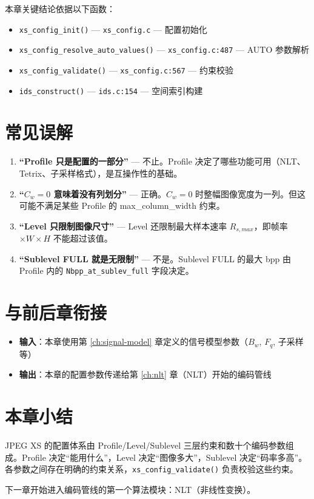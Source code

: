\begin{codefact}
本章关键结论依据以下函数：
\begin{itemize}
  \item \texttt{xs\_config\_init()} --- \texttt{xs\_config.c} --- 配置初始化
  \item \texttt{xs\_config\_resolve\_auto\_values()} --- \texttt{xs\_config.c:487} --- AUTO 参数解析
  \item \texttt{xs\_config\_validate()} --- \texttt{xs\_config.c:567} --- 约束校验
  \item \texttt{ids\_construct()} --- \texttt{ids.c:154} --- 空间索引构建
\end{itemize}
\end{codefact}

\section{常见误解}

\begin{misunderstanding}
\begin{enumerate}
  \item \textbf{``Profile 只是配置的一部分''} --- 不止。Profile 决定了哪些功能可用（NLT、Tetrix、子采样格式），是互操作性的基础。
  \item \textbf{``$C_w = 0$ 意味着没有列划分''} --- 正确。$C_w = 0$ 时整幅图像宽度为一列。但这可能不满足某些 Profile 的 max\_column\_width 约束。
  \item \textbf{``Level 只限制图像尺寸''} --- Level 还限制最大样本速率 $R_{s,max}$，即帧率 $\times W \times H$ 不能超过该值。
  \item \textbf{``Sublevel FULL 就是无限制''} --- 不是。Sublevel FULL 的最大 bpp 由 Profile 内的 \texttt{Nbpp\_at\_sublev\_full} 字段决定。
\end{enumerate}
\end{misunderstanding}

\section{与前后章衔接}

\begin{itemize}
  \item \textbf{输入}：本章使用第 \ref{ch:signal-model} 章定义的信号模型参数（$B_w$, $F_q$, 子采样等）
  \item \textbf{输出}：本章的配置参数传递给第 \ref{ch:nlt} 章（NLT）开始的编码管线
\end{itemize}

\section{本章小结}

JPEG XS 的配置体系由 Profile/Level/Sublevel 三层约束和数十个编码参数组成。Profile 决定``能用什么''，Level 决定``图像多大''，Sublevel 决定``码率多高''。各参数之间存在明确的约束关系，\texttt{xs\_config\_validate()} 负责校验这些约束。

下一章开始进入编码管线的第一个算法模块：NLT（非线性变换）。
